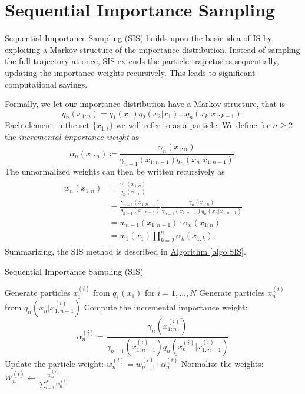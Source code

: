 \section{Sequential Importance Sampling}
Sequential Importance Sampling (SIS) builds upon the basic idea of IS by exploiting a Markov structure of the importance distribution. Instead of sampling the full trajectory at once, SIS extends the particle trajectories sequentially, updating the importance weights recursively. This leads to significant computational savings.

Formally, we let our importance distribution have a Markov structure, that is
\[
q_n(x_{1:n})=q_1(x_1)q_2(x_2\vert x_1)\dots q_n(x_k\vert x_{1:k-1}).
\]
Each element in the set $\{x_{1:t}\}$ we will refer to as a particle. We define for $n\geq 2$ the \emph{incremental importance weight} as
\[
\alpha_n(x_{1:n}) \coloneq \frac{\gamma_n(x_{1:n})}{\gamma_{n-1}(x_{1:n-1})q_n(x_n \vert x_{1:n-1})}.
\]
The unnormalized weights can then be written recursively as 
\begin{align}
	\begin{split}
		\label{eq:unnormalized_weights_recursive}
		w_n(x_{1:n})&=\frac{\gamma_n(x_{1:n})}{q_n(x_{1:n})} \\
		&=\frac{\gamma_{n-1}(x_{1:n-1})}{q_{n-1}(x_{1:n-1})}\frac{\gamma_n(x_{1:n})}{\gamma_{n-1}(x_{1:n-1})q_n(x_n\vert x_{1:n-1})} \\
		&=w_{n-1}(x_{1:n-1})\cdot \alpha_n(x_{1:n})  \\
		&=w_1(x_1) \prod_{k=2}^n \alpha_k(x_{1:k}).
	\end{split}
\end{align}
Summarizing, the SIS method is described in \hyperref[algo:SIS]{Algorithm \ref*{algo:SIS}}.

\begin{algorithm}[H]
	\caption{Sequential Importance Sampling (SIS)}
	\label{algo:SIS}
	\begin{algorithmic}[1]
		\State Generate particles \(x_1^{(i)}\) from  \(q_1(x_1)\) for \( i = 1, \dots, N \)
		\State Generate particles \(x_n^{(i)}\) from \(q_n(x_n\vert x_{1:n-1}^{(i)})\) 
		\State Compute the incremental importance weight: 
		\[
		\alpha_n^{(i)} = \frac{\gamma_n(x_{1:n}^{(i)})}{\gamma_{n-1}(x_{1:n-1}^{(i)}) q_n(x_n^{(i)} \vert x_{1:n-1}^{(i)})} 
		\] 
		\State Update the particle weight: \( w_n^{(i)} = w_{n-1}^{(i)} \cdot \alpha_n^{(i)} \)
		\EndFor
		\State Normalize the weights: \(W_n^{(i)} \leftarrow \frac{w_n^{(i)}}{\sum_{i=1}^N w_n^{(i)}} \)
		\EndFor
	\end{algorithmic}
\end{algorithm}

